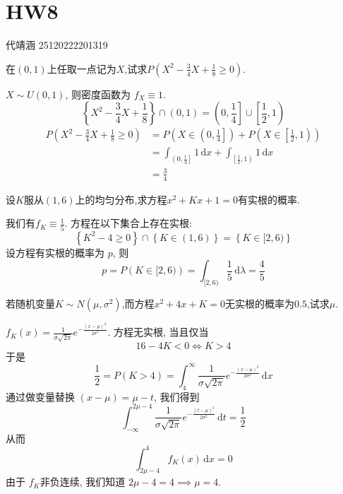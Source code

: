 \documentclass[../main.tex]{subfiles}
\begin{document}
\ifSubfilesClassLoaded{

    
    \setcounter{chapter}{7}
}{}

\chapter{ HW8 }
 代靖涵 25120222201319
\begin{exercise}{}{}
在$(0,1)$上任取一点记为$X$,试求$P\left(X^2-\frac{3}{4}X+\frac{1}{8}\geq 0\right)$.
\end{exercise}
\begin{solution}
      \(  X  \sim U\left( 0,1 \right) \), 则密度函数为 \(  f_{X}\equiv  1  \).  \[
    \left\{ X^{2}-\frac{3 }{4 }X+ \frac{1 }{8 }  \right\}\cap \left( 0,1 \right)= \left( 0,\frac{1 }{4 }  \right]\cup  \left[ \frac{1 }{2 }  ,1\right)    
    \] \[
    \begin{aligned}
    P\left( X^{2}-\frac{3 }{4 }X+ \frac{1 }{8 }\ge 0   \right)&= P\left( X \in \left( 0,\frac{1 }{4 }  \right]  \right)+ P\left( X \in \left[ \frac{1 }{2 },1  \right)  \right)  \\ 
     &= \int_{\left( 0,\frac{1 }{4 }  \right] } 1\,\mathrm{d} x+ \int_{\left[ \frac{1 }{2 },1  \right) }1\,\mathrm{d} x\\ 
      &= \frac{3 }{4 } 
    \end{aligned}   
    \]
\end{solution}


\begin{exercise}{}{}
设$K$服从$(1,6)$上的均匀分布,求方程$x^{2}+Kx+1=0$有实根的概率.
\end{exercise}

\begin{solution}
      我们有\(  f_{K}\equiv \frac{1 }{5 }   \).  方程在以下集合上存在实根: \[
    \left\{ K^{2}-4\ge 0 \right\}\cap \left\{ K \in \left( 1,6 \right)  \right\}= \left\{ K\in [2,6) \right\}
    \]设方程有实根的概率为 \(  p  \), 则  \[
    p= P\left( K\in [2,6) \right) = \int_{[2,6)}\frac{1 }{5 }\,\mathrm{d}  \lambda = \frac{4 }{5 }  
    \]
\end{solution}

\begin{exercise}{}{}
若随机变量$K\sim N(\mu,\sigma^2)$,而方程$x^2+4x+K=0$无实根的概率为$0.5$,试求$\mu$.
\end{exercise}

\begin{solution}
         \(  f_{K}\left( x \right)=  \frac{1 }{ \sigma \sqrt{2 \pi } }e^{-\frac{\left( x-\mu  \right)^{2}  }{2 \sigma ^{2} } }   \).  方程无实根, 当且仅当 \[
    16-4K< 0\iff K> 4
    \] 于是 \[
    \frac{1 }{2 }= P\left( K> 4 \right)= \int_{4}^{\infty}\frac{1 }{ \sigma \sqrt{2 \pi } }e^{-\frac{\left( x-\mu  \right)^{2}  }{ 2 \sigma ^{2}} }\,\mathrm{d} x   
    \]通过做变量替换 \(  \left( x-\mu  \right)= \mu -t   \), 我们得到 \[
     \int_{-\infty}^{2\mu -4}\frac{1 }{ \sigma \sqrt{2 \pi } }e^{-\frac{\left( t-\mu  \right)^{2}  }{ 2 \sigma ^{2}} }\,\mathrm{d} t = \frac{1 }{2 } 
    \] 从而 \[
    \int_{2\mu -4}^{4}f_{K}\left( x \right)\,\mathrm{d} x= 0 
    \]由于 \(  f_{K}  \)非负连续, 我们知道 \(  2\mu -4= 4\implies \mu = 4  \).  
\end{solution}
\end{document}
